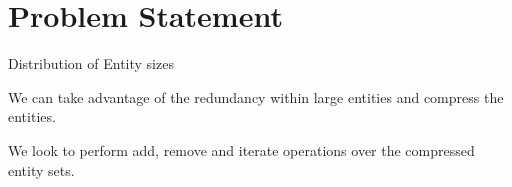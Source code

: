 
\section{Problem Statement}

Distribution of Entity sizes

We can take advantage of the redundancy within
large entities and compress the entities.

We look to perform add, remove and iterate operations
over the compressed entity sets.  




